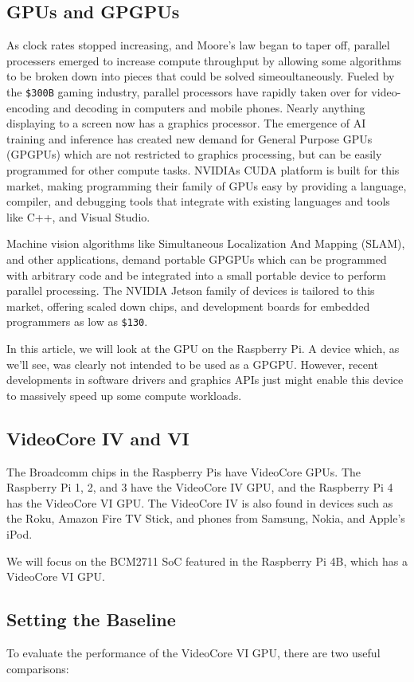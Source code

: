 \documentclass[12pt]{article}
\begin{document}
\subsection{GPUs and GPGPUs}
As clock rates stopped increasing, and Moore's law began to taper off, parallel processers emerged to increase compute throughput by allowing some algorithms to be broken down into pieces that could be solved simeoultaneously. Fueled by the \verb|$300B| gaming industry, parallel processors have rapidly taken over for video-encoding and decoding in computers and mobile phones. Nearly anything displaying to a screen now has a graphics processor. The emergence of AI training and inference has created new demand for General Purpose GPUs (GPGPUs) which are not restricted to graphics processing, but can be easily programmed for other compute tasks. NVIDIAs CUDA platform is built for this market, making programming their family of GPUs easy by providing a language, compiler, and debugging tools that integrate with existing languages and tools like C++, and Visual Studio.

Machine vision algorithms like Simultaneous Localization And Mapping (SLAM), and other applications, demand portable GPGPUs which can be programmed with arbitrary code and be integrated into a small portable device to perform parallel processing. The NVIDIA Jetson family of devices is tailored to this market, offering scaled down chips, and development boards for embedded programmers as low as \verb|$130|.

In this article, we will look at the GPU on the Raspberry Pi. A device which, as we'll see, was clearly not intended to be used as a GPGPU. However, recent developments in software drivers and graphics APIs just might enable this device to massively speed up some compute workloads. 

\subsection{VideoCore IV and VI}
The Broadcomm chips in the Raspberry Pis have VideoCore GPUs. The Raspberry Pi 1, 2, and 3 have the VideoCore IV GPU, and the Raspberry Pi 4 has the VideoCore VI GPU. The VideoCore IV is also found in devices such as the Roku, Amazon Fire TV Stick, and phones from Samsung, Nokia, and Apple's iPod. 

We will focus on the BCM2711 SoC featured in the Raspberry Pi 4B, which has a VideoCore VI GPU. 

\subsection{Setting the Baseline}
To evaluate the performance of the VideoCore VI GPU, there are two useful comparisons: 
\end{document}
